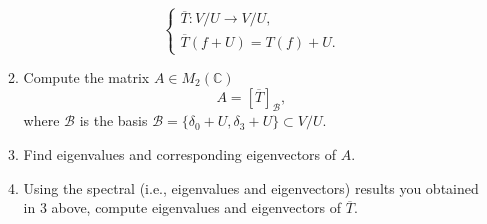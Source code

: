 \documentclass{article}
\def\cc{{\mathbb C}}
\begin{document}
\begin{problem}
\begin{enumerate}[(a)]
\begin{enumerate}[1.]
\[\begin{cases}
                    \overline{T} : V/U \to V/U, \\
                    \overline{T}(f + U) = T(f) + U.
                \end{cases}
            \]
            \item Compute the matrix $A \in M_2(\cc)$
            \[
                A = [\overline{T}]_{\mathscr{B}},
            \]
            where $\mathscr{B}$ is the basis $\mathscr{B} = \{ \delta_0 + U, \delta_3 + U \} \subset V/U$.
            \item Find eigenvalues and corresponding eigenvectors of $A$.
            \item Using the spectral (i.e., eigenvalues and eigenvectors) results you obtained in 3 above, compute eigenvalues and eigenvectors of $\overline{T}$.
        \end{enumerate}
    \end{enumerate}
\end{problem}
\end{document}
